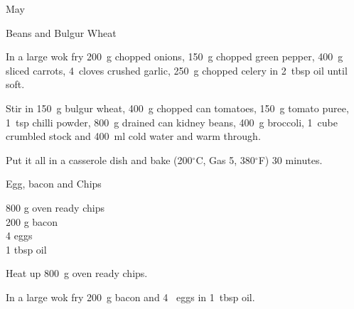 \begin{menu}{May}
\begin{recipe}{2}{Beans and Bulgur Wheat}
    \begin{instructions}
    \item 
        In a large wok fry
        200~g chopped onions,
        150~g chopped green pepper,
        400~g sliced carrots,
        4~cloves crushed garlic,
        250~g chopped celery
        in
        2~tbsp  oil
        until soft.
      \item 
        Stir in
        150~g  bulgur wheat,
        400~g chopped can tomatoes,
        150~g  tomato puree,
        1~tsp  chilli powder,
        800~g drained can kidney beans,
        400~g  broccoli,
        1~cube crumbled stock
        and
        400~ml  cold water
        and warm through.
      \item 
        Put it all in a casserole dish
        and bake (200$^{\circ}$C, Gas 5, 380$^{\circ}$F) 30 minutes.
      
    \end{instructions}
    \end{recipe}%
  
    \begin{recipe}{1}{Egg, bacon and Chips}%
		\begin{ingredients}
		800 g oven ready chips  \\
	200 g bacon  \\
	4  eggs  \\
	1 tbsp oil  \\
	
		\end{ingredients}
	
	
    \begin{instructions}
    \item 
        Heat up
        800~g  oven ready chips.
      \item 
        In a large wok fry
        200~g  bacon
        and
        4~  eggs
        in
        1~tbsp  oil.
      
    \end{instructions}
    \end{recipe}%
  
    \clearpage
    \end{menu}
	
